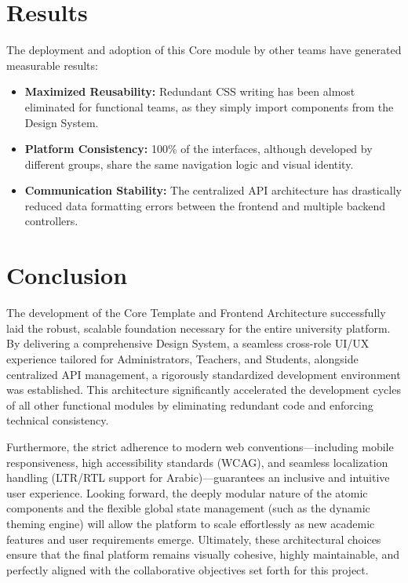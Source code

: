 \documentclass[12pt,a4paper]{report}
\begin{document}
\section{Results}
The deployment and adoption of this Core module by other teams have generated measurable results:
\begin{itemize}
    \item \textbf{Maximized Reusability:} Redundant CSS writing has been almost eliminated for functional teams, as they simply import components from the Design System.
    \item \textbf{Platform Consistency:} 100\% of the interfaces, although developed by different groups, share the same navigation logic and visual identity.
    \item \textbf{Communication Stability:} The centralized API architecture has drastically reduced data formatting errors between the frontend and multiple backend controllers.
\end{itemize}

\section{Conclusion}
The development of the Core Template and Frontend Architecture successfully laid the robust, scalable foundation necessary for the entire university platform. By delivering a comprehensive Design System, a seamless cross-role UI/UX experience tailored for Administrators, Teachers, and Students, alongside centralized API management, a rigorously standardized development environment was established. This architecture significantly accelerated the development cycles of all other functional modules by eliminating redundant code and enforcing technical consistency.

Furthermore, the strict adherence to modern web conventions—including mobile responsiveness, high accessibility standards (WCAG), and seamless localization handling (LTR/RTL support for Arabic)—guarantees an inclusive and intuitive user experience. Looking forward, the deeply modular nature of the atomic components and the flexible global state management (such as the dynamic theming engine) will allow the platform to scale effortlessly as new academic features and user requirements emerge. Ultimately, these architectural choices ensure that the final platform remains visually cohesive, highly maintainable, and perfectly aligned with the collaborative objectives set forth for this project.
\end{document}
